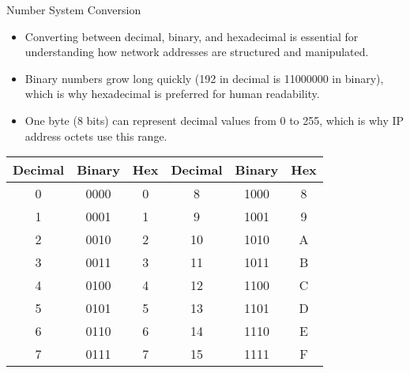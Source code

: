 \documentclass[aspectratio=169]{beamer}
\begin{document}
\begin{frame}{Number System Conversion}

\begin{itemize}
    \item Converting between decimal, binary, and hexadecimal is essential for understanding how network addresses are structured and manipulated.
    \item Binary numbers grow long quickly (192 in decimal is 11000000 in binary), which is why hexadecimal is preferred for human readability.
    \item One byte (8 bits) can represent decimal values from 0 to 255, which is why IP address octets use this range.
\end{itemize}

\vspace{0.2cm}

\begin{table}
\centering
\small
\begin{tabular}{|c|c|c||c|c|c|}
\hline
\rowcolor{networkblue!30}
\textbf{Decimal} & \textbf{Binary} & \textbf{Hex} & \textbf{Decimal} & \textbf{Binary} & \textbf{Hex} \\ \hline
0 & 0000 & 0 & 8 & 1000 & 8 \\ \hline
\rowcolor{gray!10}
1 & 0001 & 1 & 9 & 1001 & 9 \\ \hline
2 & 0010 & 2 & 10 & 1010 & A \\ \hline
\rowcolor{gray!10}
3 & 0011 & 3 & 11 & 1011 & B \\ \hline
4 & 0100 & 4 & 12 & 1100 & C \\ \hline
\rowcolor{gray!10}
5 & 0101 & 5 & 13 & 1101 & D \\ \hline
6 & 0110 & 6 & 14 & 1110 & E \\ \hline
\rowcolor{gray!10}
7 & 0111 & 7 & 15 & 1111 & F \\ \hline
\end{tabular}
\end{table}

\end{frame}
\end{document}
